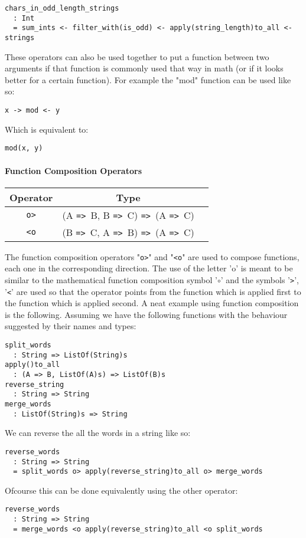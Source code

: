 \documentclass{article}
\def\ra{\texttt{=>}\ }
\begin{document}
\begin{verbatim}
chars_in_odd_length_strings
  : Int
  = sum_ints <- filter_with(is_odd) <- apply(string_length)to_all <- strings

\end{verbatim}
These operators can also be used together to put a function between two arguments
if that function is commonly used that way in math (or if it looks better for a
certain function). For example the "mod" function can be used like so:
\begin{center}
\texttt{x -> mod <- y}
\end{center}
Which is equivalent to:
\begin{center}
\texttt{mod(x, y)}
\end{center}

\paragraph{Function Composition Operators}
\begin{center}
\begin{tabular}{ |c|c|c| } 
\hline
Operator & Type \\ 
\hline
\hline
\texttt{o>} & (A \ra B, B \ra C) \ra (A \ra C) \\
\hline
\texttt{<o} & (B \ra C, A \ra B) \ra (A \ra C) \\
\hline
\end{tabular}
\end{center}
The function composition operators "\texttt{o>}" and "\texttt{<o}" are used to 
compose functions, each one in the corresponding direction. The use of the letter 'o'
is meant to be similar to the mathematical function composition symbol '\(\circ\)'
and the symbols '\texttt{>}', '\texttt{<}' are used so that the operator points from
the function which is applied first to the function which is applied second.
A neat example using function composition is the following. Assuming we have the
following functions with the behaviour suggested by their names and types: 
\begin{verbatim}
split_words
  : String => ListOf(String)s
apply()to_all
  : (A => B, ListOf(A)s) => ListOf(B)s
reverse_string
  : String => String
merge_words
  : ListOf(String)s => String
\end{verbatim}
We can reverse the all the words in a string like so:
\begin{verbatim}
reverse_words
  : String => String
  = split_words o> apply(reverse_string)to_all o> merge_words
\end{verbatim}
Ofcourse this can be done equivalently using the other operator:
\begin{verbatim}
reverse_words
  : String => String
  = merge_words <o apply(reverse_string)to_all <o split_words
\end{verbatim}
\end{document}
